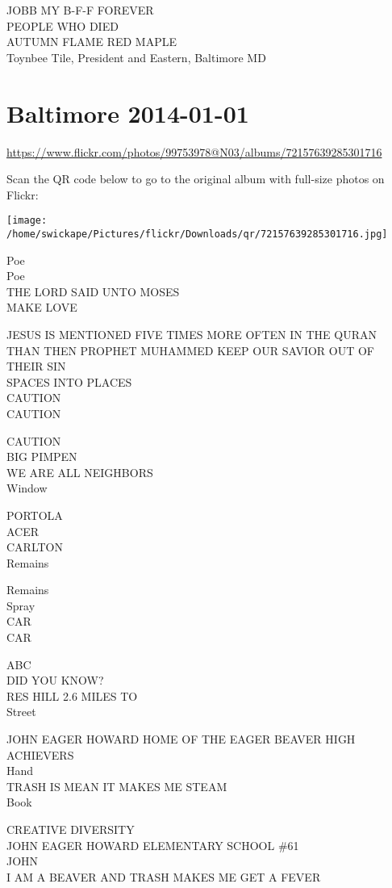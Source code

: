 \documentclass[10pt,letterpaper]{article}
\begin{document}
JOBB MY B{-}F{-}F FOREVER\\
PEOPLE WHO DIED\\
AUTUMN FLAME RED MAPLE\\
Toynbee Tile, President and Eastern, Baltimore MD


\section*{Baltimore 2014-01-01}

\url{https://www.flickr.com/photos/99753978@N03/albums/72157639285301716}

Scan the QR code below to go to the original album with full-size photos on Flickr:

\texttt{[image: /home/swickape/Pictures/flickr/Downloads/qr/72157639285301716.jpg]}


Poe\\
Poe\\
THE LORD SAID UNTO MOSES\\
MAKE LOVE

JESUS IS MENTIONED FIVE TIMES MORE OFTEN IN THE QURAN THAN THEN PROPHET MUHAMMED KEEP OUR SAVIOR OUT OF THEIR SIN\\
SPACES INTO PLACES\\
CAUTION\\
CAUTION

CAUTION\\
BIG PIMPEN\\
WE ARE ALL NEIGHBORS\\
Window

PORTOLA\\
ACER\\
CARLTON\\
Remains

Remains\\
Spray\\
CAR\\
CAR

ABC\\
DID YOU KNOW?\\
RES HILL 2.6 MILES TO\\
Street

JOHN EAGER HOWARD HOME OF THE EAGER BEAVER HIGH ACHIEVERS\\
Hand\\
TRASH IS MEAN IT MAKES ME STEAM\\
Book

CREATIVE DIVERSITY\\
JOHN EAGER HOWARD ELEMENTARY SCHOOL \#61\\
JOHN\\
I AM A BEAVER AND TRASH MAKES ME GET A FEVER
\end{document}
